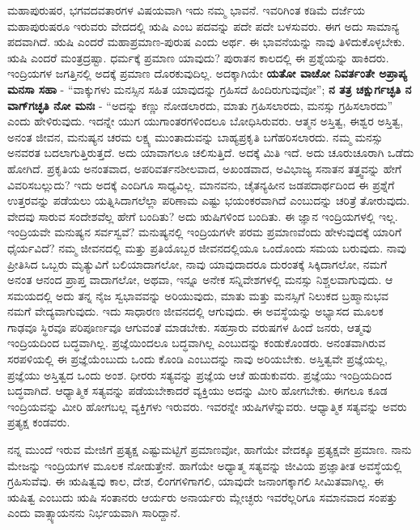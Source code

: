ಮಹಾಪುರುಷರ, ಭಗವದವತಾರಗಳ ವಿಷಯವಾಗಿ ಇದು ನಮ್ಮ ಭಾವನೆ. ಇವರಿಗಿಂತ ಕಡಿಮೆ ದರ್ಜೆಯ ಮಹಾಪುರುಷರೂ ಇರುವರು ವೇದದಲ್ಲಿ ಋಷಿ ಎಂಬ ಪದವನ್ನು ಪದೇ ಪದೇ ಬಳಸುವರು. ಈಗ ಅದು ಸಾಮಾನ್ಯ ಪದವಾಗಿದೆ. ಋಷಿ ಎಂದರೆ ಮಹಾಪ್ರಮಾಣ-ಪುರುಷ ಎಂದು ಅರ್ಥ. ಈ ಭಾವನೆಯನ್ನು ನಾವು ತಿಳಿದುಕೊಳ್ಳಬೇಕು. ಋಷಿ ಎಂದರೆ ಮಂತ್ರದ್ರಷ್ಟಾ. ಧರ್ಮಕ್ಕೆ ಪ್ರಮಾಣ ಯಾವುದು? ಪುರಾತನ ಕಾಲದಲ್ಲಿ ಈ ಪ್ರಶ್ನೆಯನ್ನು ಹಾಕಿದರು. ಇಂದ್ರಿಯಗಳ ಜಗತ್ತಿನಲ್ಲಿ ಅದಕ್ಕೆ ಪ್ರಮಾಣ ದೊರಕುವುದಿಲ್ಲ. ಅದಕ್ಕಾಗಿಯೇ \textbf{ಯತೋ ವಾಚೋ ನಿವರ್ತಂತೇ ಅಪ್ರಾಪ್ಯ ಮನಸಾ ಸಹಾ} - “ವಾಕ್ಕುಗಳು ಮನಸ್ಸಿನ ಸಹಿತ ಯಾವುದನ್ನು ಗ್ರಹಿಸದೆ ಹಿಂದಿರುಗುವುವೋ”; \textbf{ನ ತತ್ರ ಚಕ್ಷುರ್ಗಚ್ಛತಿ ನ ವಾಗ್​ಗಚ್ಛತಿ ನೋ ಮನಃ} - “ಅದನ್ನು ಕಣ್ಣು ನೋಡಲಾರದು, ಮಾತು ಗ್ರಹಿಸಲಾರದು, ಮನಸ್ಸು ಗ್ರಹಿಸಲಾರದು” ಎಂದು ಹೇಳಿರುವುದು. ಇದನ್ನೇ ಯುಗ ಯುಗಾಂತರಗಳಿಂದಲೂ ಬೋಧಿಸಿರುವರು. ಆತ್ಮನ ಅಸ್ತಿತ್ವ, ಈಶ್ವರ ಅಸ್ತಿತ್ವ, ಅನಂತ ಜೀವನ, ಮನುಷ್ಯನ\- ಚರಮ ಲಕ್ಷ್ಯ ಮುಂತಾದುವನ್ನು ಬಾಹ್ಯಪ್ರಕೃತಿ ಬಗೆಹರಿಸಲಾರದು. ನಮ್ಮ ಮನಸ್ಸು ಅನವರತ ಬದಲಾಗುತ್ತಿರುತ್ತದೆ. ಅದು ಯಾವಾಗಲೂ ಚಲಿಸುತ್ತಿದೆ. ಅದಕ್ಕೆ ಮಿತಿ ಇದೆ. ಅದು ಚೂರುಚೂರಾಗಿ ಒಡೆದು ಹೋಗಿದೆ. ಪ್ರಕೃತಿಯ ಅನಂತವಾದ, ಅಪರಿವರ್ತನಶೀಲವಾದ, ಅಖಂಡವಾದ, ಅವಿಭಾಜ್ಯ ಸನಾತನ ತತ್ತ್ವವನ್ನು ಹೇಗೆ ವಿವರಿಸಬಲ್ಲುದು? ಇದು ಅದಕ್ಕೆ ಎಂದಿಗೂ ಸಾಧ್ಯವಿಲ್ಲ. ಮಾನವನು, ಚೈತನ್ಯಹೀನ ಜಡಪದಾರ್ಥದಿಂದ ಈ ಪ್ರಶ್ನೆಗೆ ಉತ್ತರವನ್ನು ಪಡೆಯಲು ಯತ್ನಿಸಿದಾಗಲೆಲ್ಲಾ ಪರಿಣಾಮ ಎಷ್ಟು ಭಯಂಕರವಾಗಿದೆ ಎಂಬುದನ್ನು ಚರಿತ್ರೆ ತೋರುವುದು. ವೇದವು ಸಾರುವ ಸಂದೇಶವೆಲ್ಲ ಹೇಗೆ ಬಂದಿತು? ಅದು ಋಷಿಗಳಿಂದ ಬಂದಿತು. ಈ ಜ್ಞಾನ ಇಂದ್ರಿಯಗಳಲ್ಲಿ ಇಲ್ಲ. ಇಂದ್ರಿಯವೇ ಮನುಷ್ಯನ ಸರ್ವಸ್ವವೆ? ಮನುಷ್ಯನಲ್ಲಿ ಇಂದ್ರಿಯಗಳೇ ಪರಮ ಪ್ರಮಾಣವೆಂದು ಹೇಳುವುದಕ್ಕೆ ಯಾರಿಗೆ ಧೈರ್ಯವಿದೆ? ನಮ್ಮ ಜೀವನದಲ್ಲಿ ಮತ್ತು ಪ್ರತಿಯೊಬ್ಬರ ಜೀವನದಲ್ಲಿಯೂ ಒಂದೊಂದು ಸಮಯ ಬರುವುದು. ನಾವು ಪ್ರೀತಿಸಿದ ಒಬ್ಬರು ಮೃತ್ಯುವಿಗೆ ಬಲಿಯಾದಾಗಲೋ, ನಾವು ಯಾವುದಾದರೂ ದುರಂತಕ್ಕೆ ಸಿಕ್ಕಿದಾಗಲೋ, ನಮಗೆ ಅನಂತ ಆನಂದ ಪ್ರಾಪ್ತ ವಾದಾಗಲೋ, ಅಥವಾ, ಇನ್ನೂ ಅನೇಕ ಸನ್ನಿವೇಶಗಳಲ್ಲಿ ಮನಸ್ಸು ನಿಶ್ಚಲವಾಗುವುದು. ಆ ಸಮಯದಲ್ಲಿ ಅದು ತನ್ನ ನೈಜ ಸ್ವಭಾವವನ್ನು ಅರಿಯುವುದು, ಮಾತು ಮತ್ತು ಮನಸ್ಸಿಗೆ ನಿಲುಕದ ಬ್ರಹ್ಮಾನುಭವ ನಮಗೆ ವೇದ್ಯವಾಗುವುದು. ಇದು ಸಾಧಾರಣ ಜೀವನದಲ್ಲಿ ಆಗುವುದು. ಈ ಅವಸ್ಥೆಯನ್ನು ಅಭ್ಯಾಸದ ಮೂಲಕ ಗಾಢವೂ ಸ್ಥಿರವೂ ಪರಿಪೂರ್ಣವೂ ಆಗುವಂತೆ ಮಾಡಬೇಕು. ಸಹಸ್ರಾರು ವರುಷಗಳ ಹಿಂದೆ ಜನರು, ಆತ್ಮವು ಇಂದ್ರಿಯದಿಂದ ಬದ್ಧವಾಗಿಲ್ಲ. ಪ್ರಜ್ಞೆಯಿಂದಲೂ  ಬದ್ಧವಾಗಿಲ್ಲ ಎಂಬುದನ್ನು ಕಂಡುಕೊಂಡರು. ಅನಂತವಾಗಿರುವ ಸರಪಳಿಯಲ್ಲಿ ಈ ಪ್ರಜ್ಞೆಯೆಂಬುದು ಒಂದು ಕೊಂಡಿ ಎಂಬುದನ್ನು ನಾವು ಅರಿಯಬೇಕು. ಅಸ್ತಿತ್ವವೇ ಪ್ರಜ್ಞೆಯಲ್ಲ, ಪ್ರಜ್ಞೆಯು ಅಸ್ತಿತ್ವದ ಒಂದು ಅಂಶ. ಧೀರರು ಸತ್ಯವನ್ನು ಪ್ರಜ್ಞೆಯ ಆಚೆ ಹುಡುಕುವರು. ಪ್ರಜ್ಞೆಯು ಇಂದ್ರಿಯದಿಂದ ಬದ್ಧವಾಗಿದೆ. ಆಧ್ಯಾತ್ಮಿಕ ಸತ್ಯವನ್ನು ಪಡೆಯಬೇಕಾದರೆ ವ್ಯಕ್ತಿಯು ಅದನ್ನು ಮೀರಿ ಹೋಗಬೇಕು. ಈಗಲೂ ಕೂಡ ಇಂದ್ರಿಯವನ್ನು ಮೀರಿ ಹೋಗಬಲ್ಲ ವ್ಯಕ್ತಿಗಳು ಇರುವರು. ಇವರನ್ನೇ ಋಷಿಗಳೆನ್ನುವರು. ಆಧ್ಯಾತ್ಮಿಕ ಸತ್ಯವನ್ನು ಅವರು ಪ್ರತ್ಯಕ್ಷ ಕಂಡವರು.

ನನ್ನ ಮುಂದೆ ಇರುವ ಮೇಜಿಗೆ ಪ್ರತ್ಯಕ್ಷ ಎಷ್ಟುಮಟ್ಟಿಗೆ ಪ್ರಮಾಣವೋ, ಹಾಗೆಯೇ ವೇದಕ್ಕೂ ಪ್ರತ್ಯಕ್ಷವೇ ಪ್ರಮಾಣ. ನಾನು ಮೇಜನ್ನು ಇಂದ್ರಿಯಗಳ ಮೂಲಕ ನೋಡುತ್ತೇನೆ. ಹಾಗೆಯೇ ಅಧ್ಯಾತ್ಮ ಸತ್ಯವನ್ನು ಜೀವಿಯ ಪ್ರಜ್ಞಾತೀತ ಅವಸ್ಥೆಯಲ್ಲಿ ಗ್ರಹಿಸುವೆವು. ಈ ಋಷಿತ್ವವು ಕಾಲ, ದೇಶ, ಲಿಂಗಗಳಿಗಾಗಲಿ, ಯಾವುದೇ ಜನಾಂಗಕ್ಕಾಗಲಿ ಸೀಮಿತವಾಗಿಲ್ಲ. ಈ ಋಷಿತ್ವ ಎಂಬುದು ಋಷಿ ಸಂತಾನರು ಆರ್ಯರು ಅನಾರ್ಯರು ಮ್ಲೇಚ್ಛರು ಇವರೆಲ್ಲರಿಗೂ ಸಮಾನವಾದ ಸಂಪತ್ತು ಎಂದು ವಾತ್ಸ್ಯಾಯನನು ನಿರ್ಭಯವಾಗಿ ಸಾರಿದ್ದಾನೆ.

